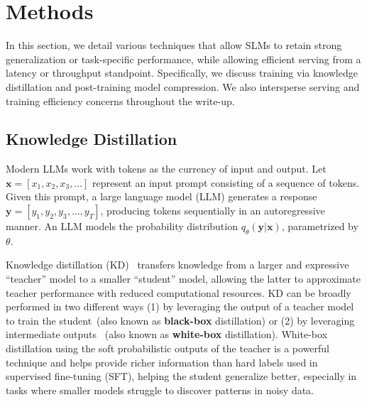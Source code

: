 \section{Methods}
\label{section:methods}


In this section, we detail various techniques that allow SLMs to retain  strong generalization or task-specific performance, while allowing efficient serving from a latency or throughput standpoint. Specifically, we discuss training via knowledge distillation and post-training model compression. We also intersperse serving and training efficiency concerns throughout the write-up. 




\subsection{Knowledge Distillation}

Modern LLMs work with tokens as the currency of input and output. Let $\mathbf{x}=[x_1, x_2, x_3, \dots]$ represent an input prompt consisting of a sequence of tokens. Given this prompt, a large language model (LLM) generates a response $\mathbf{y}=[y_1, y_2, y_3, \dots, y_T]$, producing tokens sequentially in an autoregressive manner. An LLM models the probability distribution $q_\theta(\mathbf{y}|\mathbf{x})$, parametrized by $\theta$.

Knowledge distillation (KD)~\cite{hinton2015distilling} transfers knowledge from a larger and expressive ``teacher'' model to a smaller ``student'' model, allowing the latter to approximate teacher performance with reduced computational resources. KD can be broadly performed in two different ways (1) by leveraging the output of a teacher model to train the student~\cite{tunstall2023zephyr,guo2025deepseek}(also known as \textbf{black-box} distillation) or (2) by leveraging intermediate outputs~\cite{muralidharan2024minitron,hinton2015distilling} (also known as \textbf{white-box} distillation). White-box distillation using the soft probabilistic outputs of the teacher is a powerful technique and helps provide richer information than hard labels used in supervised fine-tuning (SFT), helping the student generalize better, especially in tasks where smaller models struggle to discover patterns in noisy data.


